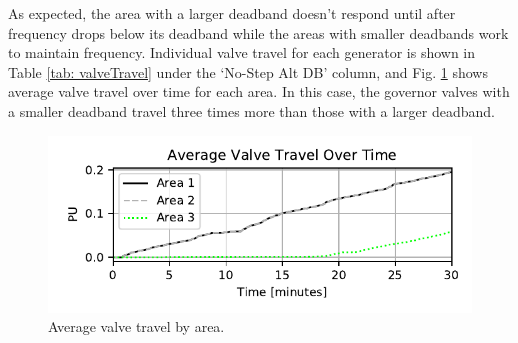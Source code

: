As expected, the area with a larger deadband doesn't respond until after frequency drops below its deadband while the areas with smaller deadbands work to maintain frequency. 
Individual valve travel for each generator is shown in Table \ref{tab: valveTravel} under the `No-Step Alt DB' column, and Fig. \ref{fig: areaValveTravel} shows average valve travel over time for each area.
In this case, the governor valves with a smaller deadband travel three times more than those with a larger deadband.

\begin{figure}[!ht]
\centering
\includegraphics[width=\linewidth]{figures/miniWECCuniAccVTOverTime}
\caption{Average valve travel by area.}
\label{fig: areaValveTravel}
\end{figure}